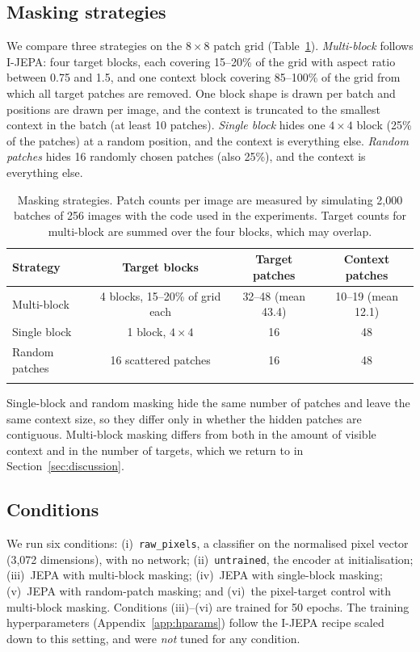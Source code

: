 \documentclass[pdflatex,sn-basic]{sn-jnl}%
\begin{document}
\subsection{Masking strategies}\label{sec:masking}
We compare three strategies on the $8\times 8$ patch grid (Table~\ref{tab:masks}). \emph{Multi-block} follows I-JEPA: four target blocks, each covering 15--20\% of the grid with aspect ratio between 0.75 and 1.5, and one context block covering 85--100\% of the grid from which all target patches are removed. One block shape is drawn per batch and positions are drawn per image, and the context is truncated to the smallest context in the batch (at least 10 patches). \emph{Single block} hides one $4\times 4$ block (25\% of the patches) at a random position, and the context is everything else. \emph{Random patches} hides 16 randomly chosen patches (also 25\%), and the context is everything else.

\begin{table}[t]
\caption{Masking strategies. Patch counts per image are measured by simulating 2,000 batches of 256 images with the code used in the experiments. Target counts for multi-block are summed over the four blocks, which may overlap.}\label{tab:masks}
\begin{tabular}{@{}lccc@{}}
\toprule
Strategy & Target blocks & Target patches & Context patches\\
\midrule
Multi-block & 4 blocks, 15--20\% of grid each & 32--48 (mean 43.4) & 10--19 (mean 12.1)\\
Single block & 1 block, $4\times4$ & 16 & 48\\
Random patches & 16 scattered patches & 16 & 48\\
\botrule
\end{tabular}
\end{table}

Single-block and random masking hide the same number of patches and leave the same context size, so they differ only in whether the hidden patches are contiguous. Multi-block masking differs from both in the amount of visible context and in the number of targets, which we return to in Section~\ref{sec:discussion}.

\subsection{Conditions}\label{sec:conditions}
We run six conditions: (i)~\texttt{raw\_pixels}, a classifier on the normalised pixel vector (3,072 dimensions), with no network; (ii)~\texttt{untrained}, the encoder at initialisation; (iii)~JEPA with multi-block masking; (iv)~JEPA with single-block masking; (v)~JEPA with random-patch masking; and (vi)~the pixel-target control with multi-block masking. Conditions (iii)--(vi) are trained for 50 epochs. The training hyperparameters (Appendix~\ref{app:hparams}) follow the I-JEPA recipe scaled down to this setting, and were \emph{not} tuned for any condition.
\end{document}
